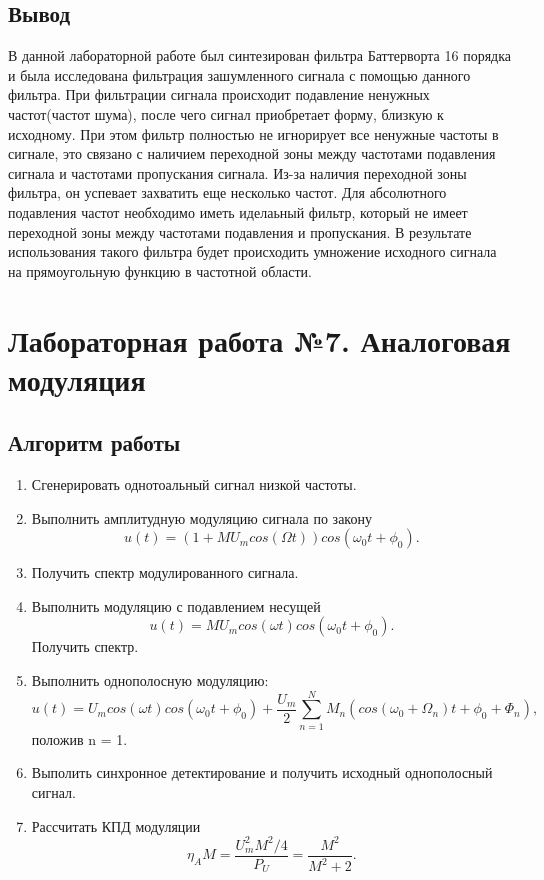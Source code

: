 \documentclass[10pt,a4paper]{report}
\begin{document}
\section{Вывод}
В данной лабораторной работе был синтезирован фильтра Баттерворта 16 порядка и была исследована фильтрация зашумленного сигнала с помощью данного фильтра.
При фильтрации сигнала происходит подавление ненужных частот(частот шума), после чего сигнал приобретает форму, близкую к исходному. При этом фильтр
полностью не игнорирует все ненужные частоты в сигнале, это связано с наличием переходной зоны между частотами подавления сигнала и частотами пропускания сигнала.
Из-за наличия переходной зоны фильтра, он успевает захватить еще несколько частот. Для абсолютного подавления частот необходимо иметь иделаьный фильтр, который не имеет
переходной зоны между частотами подавления и пропускания. В результате использования такого фильтра будет происходить умножение исходного сигнала на прямоугольную функцию
в частотной области.


\chapter{Лабораторная работа №7. Аналоговая модуляция}
\section{Алгоритм работы}


	\begin{enumerate}
		\item Сгенерировать однотоальный сигнал низкой частоты.
		\item Выполнить амплитудную модуляцию сигнала по закону
				\begin{equation}
					u(t) = (1+MU_m cos(\Omega t))cos(\omega_0 t+\phi_0).
				\end{equation}
		\item Получить спектр модулированного сигнала.
		\item Выполнить модуляцию с подавлением несущей 
				\begin{equation}
					u(t) = MU_m cos(\omega t)cos(\omega_0 t+\phi_0).
				\end{equation}
		      Получить спектр. 
		\item Выполнить однополосную модуляцию:
				\begin{equation}
					u(t) = U_m cos(\omega t)cos(\omega_0 t+\phi_0)+\frac{U_m}{2}\sum_{n=1}^N M_n (cos(\omega_0 + \Omega_n )t + \phi_0 + \Phi_n ),
				\end{equation}
				положив n = 1.
		\item Выполить синхронное детектирование и получить исходный однополосный сигнал.
		\item Рассчитать КПД модуляции
				\begin{equation}
					\eta_A M = \frac{U_m ^2 M^2 /4}{P_U} = \frac{M^2}{M^2 + 2}.
				\end{equation}
	\end{enumerate}
\end{document}
